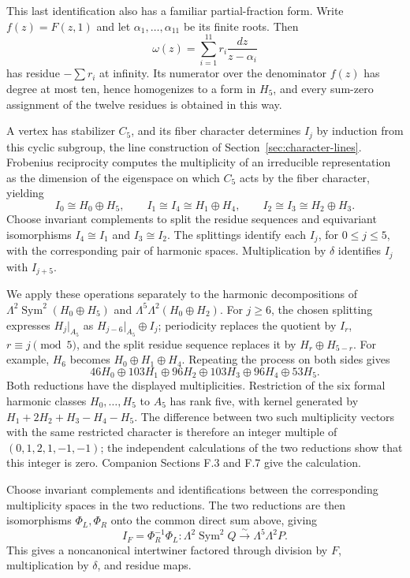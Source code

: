 \documentclass[11pt,a4paper]{article}
\begin{document}
This last identification also has a familiar partial-fraction form. Write $f(z)=F(z,1)$ and let $\alpha_1,\ldots,\alpha_{11}$ be its finite roots. Then
\[
\omega(z)=\sum_{i=1}^{11}r_i\frac{dz}{z-\alpha_i}
\]
has residue $-\sum r_i$ at infinity. Its numerator over the denominator $f(z)$ has degree at most ten, hence homogenizes to a form in $H_5$, and every sum-zero assignment of the twelve residues is obtained in this way.

A vertex has stabilizer $C_5$, and its fiber character determines $I_j$ by induction from this cyclic subgroup, the line construction of Section~\ref{sec:character-lines}. Frobenius reciprocity computes the multiplicity of an irreducible representation as the dimension of the eigenspace on which \(C_5\) acts by the fiber character, yielding
\[
I_0\cong H_0\oplus H_5,\qquad
I_1\cong I_4\cong H_1\oplus H_4,\qquad
I_2\cong I_3\cong H_2\oplus H_3.
\]
Choose invariant complements to split the residue sequences and equivariant isomorphisms $I_4\cong I_1$ and $I_3\cong I_2$. The splittings identify each $I_j$, for $0\leq j\leq5$, with the corresponding pair of harmonic spaces. Multiplication by $\delta$ identifies $I_j$ with $I_{j+5}$.

We apply these operations separately to the harmonic decompositions of
$\Lambda^2\operatorname{Sym}^2(H_0\oplus H_5)$ and
$\Lambda^5\Lambda^2(H_0\oplus H_2)$. For \(j\geq6\), the chosen splitting expresses \(H_j|_{A_5}\) as \(H_{j-6}|_{A_5}\oplus I_j\); periodicity replaces the quotient by \(I_r\), $r\equiv j\pmod5$, and the split residue sequence replaces it by $H_r\oplus H_{5-r}$. For example, $H_6$ becomes $H_0\oplus H_1\oplus H_4$. Repeating the process on both sides gives
\[
46H_0\oplus103H_1\oplus96H_2\oplus103H_3\oplus96H_4\oplus53H_5.
\]
Both reductions have the displayed multiplicities. Restriction of the six formal harmonic classes \(H_0,\ldots,H_5\) to \(A_5\) has rank five, with kernel generated by \(H_1+2H_2+H_3-H_4-H_5\). The difference between two such multiplicity vectors with the same restricted character is therefore an integer multiple of \((0,1,2,1,-1,-1)\); the independent calculations of the two reductions show that this integer is zero. Companion Sections F.3 and F.7 give the calculation.

Choose invariant complements and identifications between the corresponding multiplicity spaces in the two reductions. The two reductions are then isomorphisms $\Phi_L,\Phi_R$ onto the common direct sum above, giving
\begin{equation}\label{eq:residue-cut}
I_F=\Phi_R^{-1}\Phi_L:
\Lambda^2\operatorname{Sym}^2Q\xrightarrow{\sim}\Lambda^5\Lambda^2P.
\end{equation}
This gives a noncanonical intertwiner factored through division by $F$, multiplication by $\delta$, and residue maps.
\FloatBarrier
{}
\end{document}
